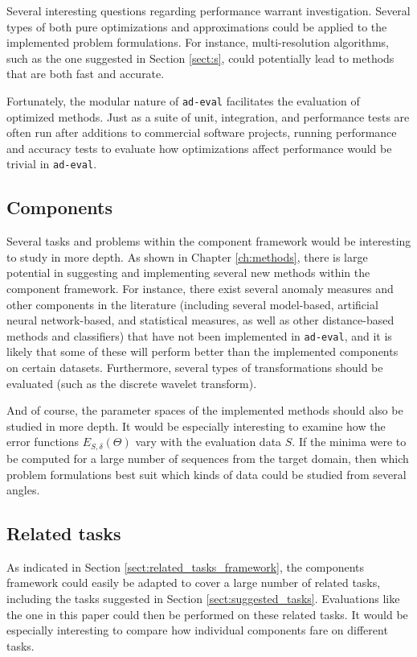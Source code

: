 Several interesting questions regarding performance warrant investigation. Several types of both pure optimizations and approximations could be applied to the implemented problem formulations. For instance, multi-resolution algorithms, such as the one suggested in Section \ref{sect:s}, could potentially lead to methods that are both fast and accurate.

Fortunately, the modular nature of \texttt{ad-eval} facilitates the evaluation of optimized methods. Just as a suite of unit, integration, and performance tests are often run after additions to commercial software projects, running performance and accuracy tests to evaluate how optimizations affect performance would be trivial in \texttt{ad-eval}.

\subsection{Components}

Several tasks and problems within the component framework would be interesting to study in more depth. As shown in Chapter \ref{ch:methods}, there is large potential in suggesting and implementing several new methods within the component framework. For instance, there exist several anomaly measures and other components in the literature (including several model-based, artificial neural network-based, and statistical measures, as well as other distance-based methods and classifiers) that have not been implemented in \texttt{ad-eval}, and it is likely that some of these will perform better than the implemented components on certain datasets. Furthermore, several types of transformations should be evaluated (such as the discrete wavelet transform).

And of course, the parameter spaces of the implemented methods should also be studied in more depth. It would be especially interesting to examine how the error functions $E_{S, \delta}(\Theta)$ vary with the evaluation data $S$. If the minima were to be computed for a large number of sequences from the target domain, then which problem formulations best suit which kinds of data could be studied from several angles.

\subsection{Related tasks}

As indicated in Section \ref{sect:related_tasks_framework}, the components framework could easily be adapted to cover a large number of related tasks, including the tasks suggested in Section \ref{sect:suggested_tasks}. Evaluations like the one in this paper could then be performed on these related tasks. It would be especially interesting to compare how individual components fare on different tasks.

